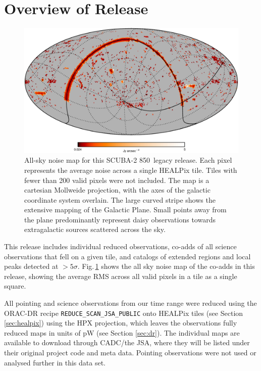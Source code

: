 \documentclass[twocolumn,times]{aastex6}
\newcommand{\um}{\micron}
\begin{document}
\section{Overview of Release}
\begin{figure}
  \centering
  \includegraphics{mollweide-average-noise-galacticaxes-crop}
  \caption{All-sky noise map for this SCUBA-2 850\,\um{} legacy
    release. Each pixel represents the average noise across a single
    HEALPix tile. Tiles with fewer than 200 valid pixels were not
    included. The map is a cartesian Mollweide projection, with the
    axes of the galactic coordinate system overlain. The large curved
    stripe shows the extensive mapping of the Galactic Plane. Small points
    away from the plane predominantly represent daisy observations
    towards extragalactic sources scattered across the sky.}
  \label{fig:noise-mollweide}
\end{figure}

This release includes individual reduced observations, co-adds of all
science observations that fell on a given tile, and catalogs of
extended regions and local peaks detected at
$>5\sigma$. Fig.\,\ref{fig:noise-mollweide} shows the all sky noise map
of the co-adds in this release, showing the average RMS across all
valid pixels in a tile as a single square.

All pointing and science observations from our time range were reduced
using the ORAC-DR recipe \texttt{REDUCE\_SCAN\_JSA\_PUBLIC} onto
HEALPix tiles (see Section \ref{sec:healpix}) using the HPX
projection, which leaves the observations fully reduced maps in units
of pW (see Section \ref{sec:dr}). The individual maps are available to
download through CADC/the JSA, where they will be listed under their
original project code and meta data. Pointing observations were not
used or analysed further in this data set.
\end{document}

